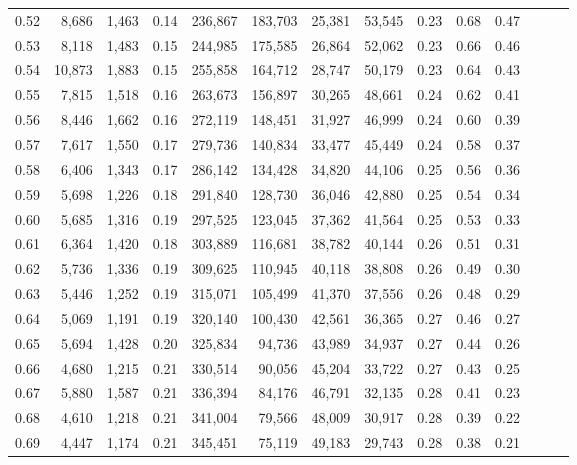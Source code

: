 \begin{tabular}{rrrrrrrrrrrrrr}
0.52 &   8,686 &  1,463 &  0.14 &  236,867 &  183,703 &  25,381 &  53,545 &  0.23 &  0.68 &      0.47 \\
0.53 &   8,118 &  1,483 &  0.15 &  244,985 &  175,585 &  26,864 &  52,062 &  0.23 &  0.66 &      0.46 \\
0.54 &  10,873 &  1,883 &  0.15 &  255,858 &  164,712 &  28,747 &  50,179 &  0.23 &  0.64 &      0.43 \\
0.55 &   7,815 &  1,518 &  0.16 &  263,673 &  156,897 &  30,265 &  48,661 &  0.24 &  0.62 &      0.41 \\
0.56 &   8,446 &  1,662 &  0.16 &  272,119 &  148,451 &  31,927 &  46,999 &  0.24 &  0.60 &      0.39 \\
0.57 &   7,617 &  1,550 &  0.17 &  279,736 &  140,834 &  33,477 &  45,449 &  0.24 &  0.58 &      0.37 \\
0.58 &   6,406 &  1,343 &  0.17 &  286,142 &  134,428 &  34,820 &  44,106 &  0.25 &  0.56 &      0.36 \\
0.59 &   5,698 &  1,226 &  0.18 &  291,840 &  128,730 &  36,046 &  42,880 &  0.25 &  0.54 &      0.34 \\
0.60 &   5,685 &  1,316 &  0.19 &  297,525 &  123,045 &  37,362 &  41,564 &  0.25 &  0.53 &      0.33 \\
0.61 &   6,364 &  1,420 &  0.18 &  303,889 &  116,681 &  38,782 &  40,144 &  0.26 &  0.51 &      0.31 \\
0.62 &   5,736 &  1,336 &  0.19 &  309,625 &  110,945 &  40,118 &  38,808 &  0.26 &  0.49 &      0.30 \\
0.63 &   5,446 &  1,252 &  0.19 &  315,071 &  105,499 &  41,370 &  37,556 &  0.26 &  0.48 &      0.29 \\
0.64 &   5,069 &  1,191 &  0.19 &  320,140 &  100,430 &  42,561 &  36,365 &  0.27 &  0.46 &      0.27 \\
0.65 &   5,694 &  1,428 &  0.20 &  325,834 &   94,736 &  43,989 &  34,937 &  0.27 &  0.44 &      0.26 \\
0.66 &   4,680 &  1,215 &  0.21 &  330,514 &   90,056 &  45,204 &  33,722 &  0.27 &  0.43 &      0.25 \\
0.67 &   5,880 &  1,587 &  0.21 &  336,394 &   84,176 &  46,791 &  32,135 &  0.28 &  0.41 &      0.23 \\
0.68 &   4,610 &  1,218 &  0.21 &  341,004 &   79,566 &  48,009 &  30,917 &  0.28 &  0.39 &      0.22 \\
0.69 &   4,447 &  1,174 &  0.21 &  345,451 &   75,119 &  49,183 &  29,743 &  0.28 &  0.38 &      0.21 \\

\end{tabular}
